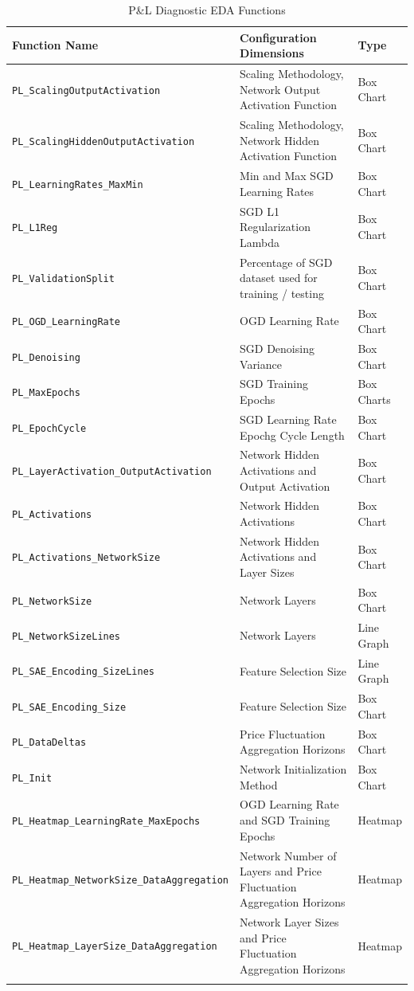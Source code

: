 \documentclass[a4paper,11pt,oneside]{article}
\theoremstyle{plain}
\theoremstyle{definition}
\begin{document}
	\begin{longtable}{|p{0.5\linewidth}|p{0.4\linewidth}|p{0.1\linewidth}|}
		\hline
		\textbf{Function Name} &\textbf{Configuration Dimensions}&\textbf{Type}  \\\hline	
		\texttt{PL\_ScalingOutputActivation} & {Scaling Methodology, Network Output Activation Function}& {Box Chart} \\\hline
		\texttt{PL\_ScalingHiddenOutputActivation} & {Scaling Methodology, Network Hidden Activation Function}& {Box Chart} \\\hline
		\texttt{PL\_LearningRates\_MaxMin}& {Min and Max SGD Learning Rates} & {Box Chart} \\\hline
		\texttt{PL\_L1Reg} & {SGD L1 Regularization Lambda}& {Box Chart} \\\hline
		\texttt{PL\_ValidationSplit} & {Percentage of SGD dataset used for training / testing}& {Box Chart} \\\hline
		\texttt{PL\_OGD\_LearningRate}& {OGD Learning Rate} & {Box Chart} \\\hline
		\texttt{PL\_Denoising} & {SGD Denoising Variance}& {Box Chart} \\\hline
		\texttt{PL\_MaxEpochs} & {SGD Training Epochs}& {Box Charts} \\\hline
		\texttt{PL\_EpochCycle}& {SGD Learning Rate Epochg Cycle Length} & {Box Chart} \\\hline
		\texttt{PL\_LayerActivation\_OutputActivation} & {Network Hidden Activations and Output Activation}& {Box Chart} \\\hline
		\texttt{PL\_Activations} & {Network Hidden Activations}& {Box Chart} \\\hline
		\texttt{PL\_Activations\_NetworkSize}& {Network Hidden Activations and Layer Sizes} & {Box Chart} \\\hline
		\texttt{PL\_NetworkSize}& {Network Layers} & {Box Chart} \\\hline
		\texttt{PL\_NetworkSizeLines}& {Network Layers} & {Line Graph} \\\hline
		\texttt{PL\_SAE\_Encoding\_SizeLines}& {Feature Selection Size} & {Line Graph} \\\hline
		\texttt{PL\_SAE\_Encoding\_Size} & {Feature Selection Size}& {Box Chart} \\\hline
		\texttt{PL\_DataDeltas} & {Price Fluctuation Aggregation Horizons}& {Box Chart} \\\hline
		\texttt{PL\_Init}& {Network Initialization Method} & {Box Chart} \\\hline		
		\texttt{PL\_Heatmap\_LearningRate\_MaxEpochs} & {OGD Learning Rate and SGD Training Epochs}& {Heatmap} \\\hline
		\texttt{PL\_Heatmap\_NetworkSize\_DataAggregation} & {Network Number of Layers and Price Fluctuation Aggregation Horizons}& {Heatmap} \\\hline
		\texttt{PL\_Heatmap\_LayerSize\_DataAggregation}& {Network Layer Sizes and Price Fluctuation Aggregation Horizons } & {Heatmap} \\\hline
		
		\caption{P\&L Diagnostic EDA Functions}
		\label{tab_diagnostics_pl}
	\end{longtable}
	
\end{document}

